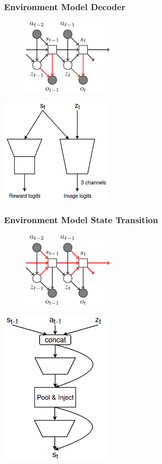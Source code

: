 \begin{frame}
	\frametitle{Environment Model Decoder}
	\begin{multicols}{2}
		\begin{figure}[h]
			\includegraphics[width=0.4\textwidth]{./latent_i2a_images/sSSM2_decoder_marked.png}	
		\end{figure}
		\columnbreak
		\includegraphics[width=0.4\textwidth]{./latent_i2a_images/LatentSpaceDecoder.png}
	\end{multicols}
\end{frame}

\begin{frame}
	\frametitle{Environment Model State Transition}
	\begin{multicols}{2}
		\begin{figure}[h]
			\includegraphics[width=0.4\textwidth]{./latent_i2a_images/sSSM2_state_transition_marked.png}	
		\end{figure}
		\columnbreak
		\includegraphics[width=0.4\textwidth]{./latent_i2a_images/LatentSpaceTransition.png}
	\end{multicols}
\end{frame}


